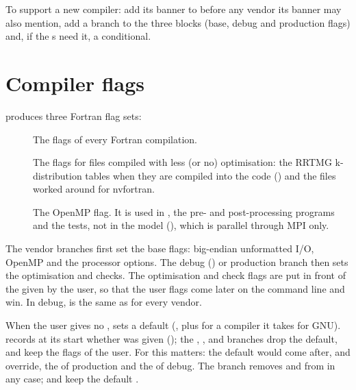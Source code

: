 To support a new compiler: add its banner to  before
any vendor its banner may also mention, add a branch to the three
 blocks (base, debug and production flags) and, if
the s need it, a conditional.

\section{Compiler flags}
\label{sec:fcflags}

 produces three Fortran flag sets:

\begin{description}
  \item[] The flags of every Fortran compilation.
  \item[] The flags for files compiled with less (or no)
    optimisation: the RRTMG k-distribution tables when they are compiled
    into the code () and the files worked around for
    nvfortran.
  \item[] The OpenMP flag. It is used in , the
    pre- and post-processing programs and the tests, not in the model
    (), which is parallel through MPI only.
\end{description}

The vendor branches first set the base flags: big-endian unformatted I/O,
OpenMP and the processor options. The debug () or
production branch then sets the optimisation and checks. The optimisation
and check flags are put in front of the  given by the user,
so that the user flags come later on the command line and win. In debug,
 is the same as  for every vendor.

When the user gives no ,  sets a default
(, plus  for a compiler it takes for GNU).
 records at its start whether  was given
(); the , ,
 and  branches drop the default, and keep the
flags of the user. For  this matters: the default 
would come after, and override, the  of production and the
 of debug. The  branch removes  and
 from  in any case;  and  keep
the default .

